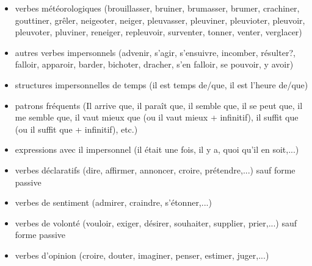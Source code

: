 \documentclass[a4paper,12pt]{article}
\begin{document}
\begin{itemize}
\begin{itemize}
  \item verbes météorologiques (brouillasser, bruiner, brumasser, brumer, crachiner, gouttiner, grêler, neigeoter, neiger, pleuvasser, pleuviner, pleuvioter, pleuvoir, pleuvoter,  pluviner, reneiger, repleuvoir, surventer, tonner, venter, verglacer)
  \item autres verbes impersonnels (advenir, s'agir, s'ensuivre, incomber, résulter?, falloir, apparoir, barder, bichoter, dracher, s'en falloir, se pouvoir, y avoir)
  \item structures impersonnelles de temps (il est temps de/que, il est l'heure de/que)
  \item patrons fréquents (Il arrive que, il paraît que, il semble que, il se peut que, il me semble que, il vaut mieux que (ou il vaut mieux + infinitif), il suffit que (ou il suffit que + infinitif), etc.)
  \item expressions avec il impersonnel (il était une fois, il y a, quoi qu'il en soit,...)
  \item verbes déclaratifs (dire, affirmer, annoncer, croire, prétendre,...) sauf forme passive
  \item verbes de sentiment (admirer, craindre, s'étonner,...)
  \item verbes de volonté (vouloir, exiger, désirer, souhaiter, supplier, prier,...) sauf forme passive
  \item verbes d'opinion (croire, douter, imaginer, penser, estimer, juger,...)
 \end{itemize}
\end{itemize}

% 
% 
\end{document}
